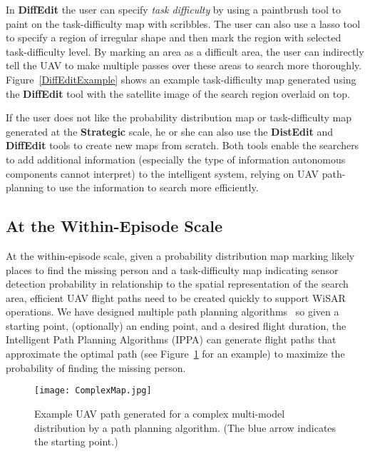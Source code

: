 In \textbf{DiffEdit} the user can specify \textit{task difficulty} by using a paintbrush tool to paint on the task-difficulty map with scribbles. The user can also use a lasso tool to specify a region of irregular shape and then mark the region with selected task-difficulty level. By marking an area as a difficult area, the user can indirectly tell the UAV to make multiple passes over these areas to search more thoroughly. Figure~\ref{DiffEditExample} shows an example task-difficulty map generated using the \textbf{DiffEdit} tool with the satellite image of the search region overlaid on top.

If the user does not like the probability distribution map or task-difficulty map generated at the \textbf{Strategic} scale, he or she can also use the \textbf{DistEdit} and \textbf{DiffEdit} tools to create new maps from scratch. Both tools enable the searchers to add additional information (especially the type of information autonomous components cannot interpret) to the intelligent system, relying on UAV path-planning to use the information to search more efficiently.

\subsection{At the Within-Episode Scale}

At the within-episode scale, given a probability distribution map marking likely places to find the missing person and a task-difficulty map indicating sensor detection probability in relationship to the spatial representation of the search area, efficient UAV flight paths need to be created quickly to support WiSAR operations. We have designed multiple path planning algorithms~\cite{Lin2009UAV,Lin2014Hierarchical} so given a starting point, (optionally) an ending point, and a desired flight duration, the Intelligent Path Planning Algorithms (IPPA) can generate flight paths that approximate the optimal path (see Figure~\ref{path} for an example) to maximize the probability of finding the missing person.

\begin{figure}
\centering
\texttt{[image: ComplexMap.jpg]}
\caption{Example UAV path generated for a complex multi-model distribution by a path planning algorithm. (The blue arrow indicates the starting point.)}
\label{path}
\end{figure}

